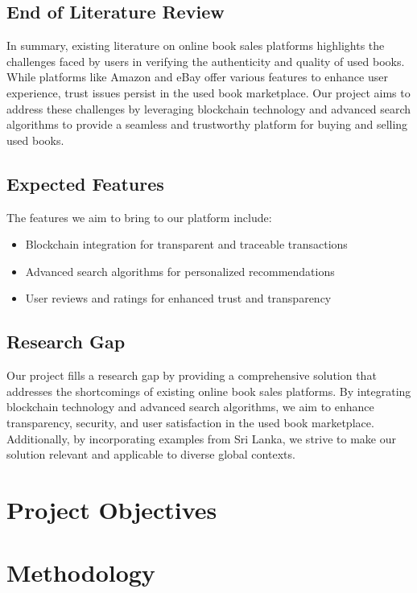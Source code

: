 \documentclass{article}
\begin{document}
\subsection{End of Literature Review}

In summary, existing literature on online book sales platforms highlights the challenges faced by users in verifying the authenticity and quality of used books. While platforms like Amazon and eBay offer various features to enhance user experience, trust issues persist in the used book marketplace. Our project aims to address these challenges by leveraging blockchain technology and advanced search algorithms to provide a seamless and trustworthy platform for buying and selling used books.

\subsection{Expected Features}

The features we aim to bring to our platform include:

\begin{itemize}
    \item Blockchain integration for transparent and traceable transactions
    \item Advanced search algorithms for personalized recommendations
    \item User reviews and ratings for enhanced trust and transparency
\end{itemize}

\subsection{Research Gap}

Our project fills a research gap by providing a comprehensive solution that addresses the shortcomings of existing online book sales platforms. By integrating blockchain technology and advanced search algorithms, we aim to enhance transparency, security, and user satisfaction in the used book marketplace. Additionally, by incorporating examples from Sri Lanka, we strive to make our solution relevant and applicable to diverse global contexts.


\section{Project Objectives}

\section{Methodology}
\end{document}
